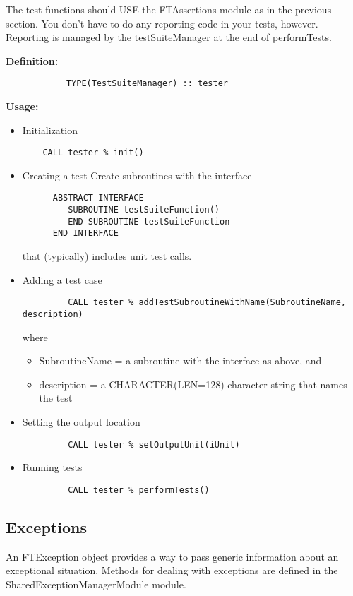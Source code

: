 \documentclass[9pt]{article}
\begin{document}
The test functions should USE the FTAssertions module as in the previous section. You don't have to do any reporting code in your tests, however. Reporting is managed by the testSuiteManager at the end of performTests.

     {\bf Definition:}
	{\color{blue}\begin{verbatim}
        	TYPE(TestSuiteManager) :: tester
	\end{verbatim}}
     {\bf Usage:}
\begin{itemize}
\item Initialization
	{\color{blue}\begin{verbatim}
    CALL tester % init()
	\end{verbatim}}
	
\item Creating a test
   Create subroutines with the interface
{\color{blue}\begin{verbatim}
      ABSTRACT INTERFACE
         SUBROUTINE testSuiteFunction()
         END SUBROUTINE testSuiteFunction
      END INTERFACE
\end{verbatim}}
that (typically) includes unit test calls. 
\item Adding a test case
	{\color{blue}\begin{verbatim}
         CALL tester % addTestSubroutineWithName(SubroutineName, description)
	\end{verbatim}}
where
\begin{itemize}
\item SubroutineName = a subroutine with the interface as above, and 
\item description = a CHARACTER(LEN=128) character string that names the test
\end{itemize}

\item Setting the output location
	{\color{blue}\begin{verbatim}
         CALL tester % setOutputUnit(iUnit)
	\end{verbatim}}
\item Running tests
	{\color{blue}\begin{verbatim}
         CALL tester % performTests()
	\end{verbatim}}
\end{itemize}

\subsection{Exceptions}
      An FTException object provides a way to pass generic
      information about an exceptional situation. Methods for
      dealing with exceptions are defined in the SharedExceptionManagerModule
      module.
\end{document}
